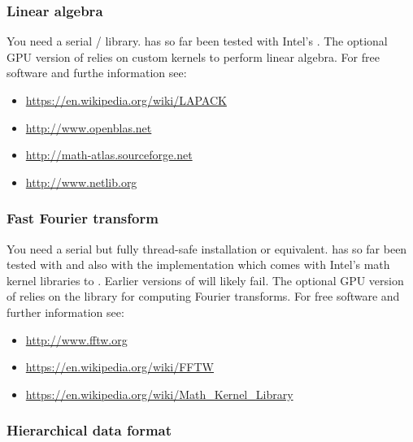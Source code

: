 \documentclass[a4paper, 11pt, DIV=11]{scrartcl}
\begin{document}
\subsubsection{Linear algebra}
\label{sec:linearAlgebra}

You need a serial / library. \nsc has so far been tested with
Intel's . The optional GPU version of \nsc relies on custom \cuda kernels
to perform linear algebra.
For free software and furthe information see:
\begin{itemize}
\item \url{https://en.wikipedia.org/wiki/LAPACK}
\item \url{http://www.openblas.net}
\item \url{http://math-atlas.sourceforge.net}
\item \url{http://www.netlib.org}
\end{itemize}

\subsubsection{Fast Fourier transform}
\label{sec:fftw}

You need a serial but fully thread-safe  installation
or equivalent. \nsc has so far been tested with 
and also with the  implementation which comes with
Intel's math kernel libraries  to .
Earlier versions of  will likely fail. The optional GPU
version of \nsc relies on the  library for computing
Fourier transforms. 
For free software and further information see:
\begin{itemize}
\item \url{http://www.fftw.org}
\item \url{https://en.wikipedia.org/wiki/FFTW}
\item \url{https://en.wikipedia.org/wiki/Math_Kernel_Library}
\end{itemize}

\subsubsection{Hierarchical data format}
\label{sec:hdf5}
\end{document}
